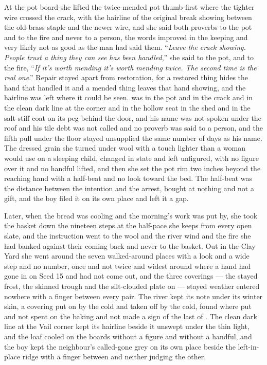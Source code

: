 At the pot board she lifted the twice-mended pot thumb-first where the tighter wire crossed the crack, with the hairline of the original break showing between the old-brass staple and the newer wire, and she said both proverbs to the pot and to the fire and never to a person, the words improved in the keeping and very likely not as good as the man had said them. “\emph{Leave the crack showing. People trust a thing they can see has been handled},” she said to the pot, and to the fire, “\emph{If it's worth mending it's worth mending twice. The second time is the real one}.” Repair stayed apart from restoration, for a restored thing hides the hand that handled it and a mended thing leaves that hand showing, and the hairline was left where it could be seen.  was in the pot and in the crack and in the clean dark line at the corner and in the hollow seat in the shed and in the salt-stiff coat on its peg behind the door, and his name was not spoken under the roof and his tile debt was not called and no proverb was said to a person, and the fifth pull under the floor stayed unsupplied the same number of days as his name. The dressed grain she turned under wool with a touch lighter than a woman would use on a sleeping child, changed in state and left unfigured, with no figure over it and no handful lifted, and then she set the pot rim two inches beyond the reaching hand with a half-beat and no look toward the bed. The half-beat was the distance between the intention and the arrest, bought at nothing and not a gift, and the boy filed it on its own place and left it a gap.

\scenebreak

Later, when the bread was cooling and the morning's work was put by, she took the basket down the nineteen steps at the half-pace she keeps from every open slate, and the instruction went to the wool and the river wind and the fire she had banked against their coming back and never to the basket. Out in the Clay Yard she went around the seven walked-around places with a look and a wide step and no number, once and not twice and widest around  where a hand had gone in on Seed 15 and had not come out, and the three coverings --- the stayed frost, the skinned trough and the silt-clouded plate on  --- stayed weather entered nowhere with a finger between every pair. The river kept its note under its winter skin, a covering put on by the cold and taken off by the cold, found where put and not spent on the baking and not made a sign of the last of . The clean dark line at the Vail corner kept its hairline beside it unswept under the thin light, and the loaf cooled on the boards without a figure and without a handful, and the boy kept the neighbour's called-gone grey on its own place beside the left-in-place ridge with a finger between and neither judging the other.

